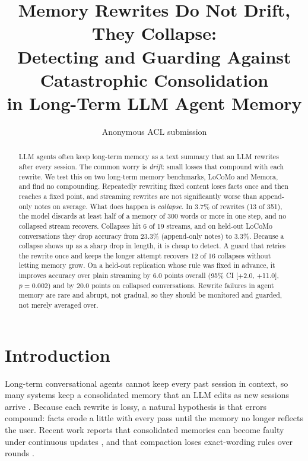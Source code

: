 \documentclass[11pt]{article}
\title{Memory Rewrites Do Not Drift, They Collapse:\\ Detecting and Guarding Against Catastrophic Consolidation\\ in Long-Term LLM Agent Memory}
\author{Anonymous ACL submission}
\begin{document}
\maketitle

\begin{abstract}
LLM agents often keep long-term memory as a text summary that an LLM rewrites after every session. The common worry is \emph{drift}: small losses that compound with each rewrite. We test this on two long-term memory benchmarks, LoCoMo and Memora, and find no compounding. Repeatedly rewriting fixed content loses facts once and then reaches a fixed point, and streaming rewrites are not significantly worse than append-only notes on average. What does happen is \emph{collapse}. In 3.7\% of rewrites (13 of 351), the model discards at least half of a memory of 300 words or more in one step, and no collapsed stream recovers. Collapses hit 6 of 19 streams, and on held-out LoCoMo conversations they drop accuracy from 23.3\% (append-only notes) to 3.3\%. Because a collapse shows up as a sharp drop in length, it is cheap to detect. A guard that retries the rewrite once and keeps the longer attempt recovers 12 of 16 collapses without letting memory grow. On a held-out replication whose rule was fixed in advance, it improves accuracy over plain streaming by 6.0 points overall (95\% CI [+2.0, +11.0], $p{=}0.002$) and by 20.0 points on collapsed conversations. Rewrite failures in agent memory are rare and abrupt, not gradual, so they should be monitored and guarded, not merely averaged over.
\end{abstract}

\section{Introduction}
Long-term conversational agents cannot keep every past session in context, so many systems keep a consolidated memory that an LLM edits as new sessions arrive \citep{packer2023memgpt,chhikara2025mem0,xu2025amem,rasmussen2025zep}. Because each rewrite is lossy, a natural hypothesis is that errors compound: facts erode a little with every pass until the memory no longer reflects the user. Recent work reports that consolidated memories can become faulty under continuous updates \citep{zhang2026faulty}, and that compaction loses exact-wording rules over rounds \citep{zerhoudi2026cliff}.
\end{document}
